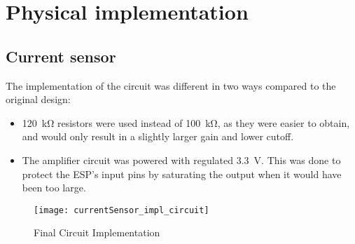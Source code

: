 \graphicspath{{content/figures/}}
\chapter{Physical implementation}\label{ch:implementation}

\section{Current sensor}\label{sec:current_sensor_physical}

The implementation of the circuit was different in two ways compared to the original design:
\begin{itemize}
   \item \SI{120}{\kilo\ohm} resistors were used instead of \SI{100}{\kilo\ohm}, as they were easier to obtain, and would only result in a
         slightly larger gain and lower cutoff.
   \item The amplifier circuit was powered with regulated \SI{3.3}{V}. This was done to protect the ESP's input pins by saturating the output
         when it would have been too large.
\end{itemize}

\begin{figure}[!htb]
  \centering
  \texttt{[image: currentSensor\_impl\_circuit]}
  \caption{Final Circuit Implementation}
\end{figure}
